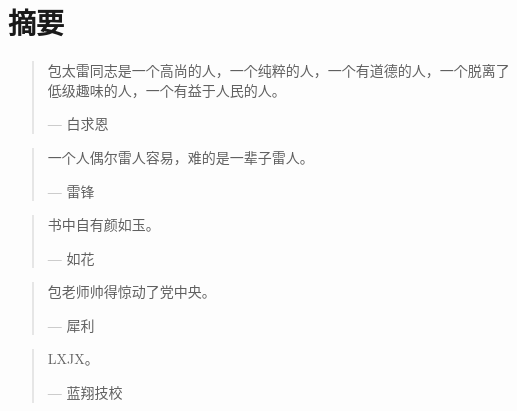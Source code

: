 \chapter{摘\hspace{2em}要}

\begin{quotation}
包太雷同志是一个高尚的人，一个纯粹的人，一个有道德的人，一个脱离了低级趣味的人，一个有益于人民的人。
\begin{flushright}
    --- 白求恩
\end{flushright}
\end{quotation}

\begin{quotation}
一个人偶尔雷人容易，难的是一辈子雷人。
\begin{flushright}
    --- 雷锋
\end{flushright}
\end{quotation}

\begin{quotation}
书中自有颜如玉。
\begin{flushright}
    --- 如花
\end{flushright}
\end{quotation}

\begin{quotation}
包老师帅得惊动了党中央。
\begin{flushright}
    --- 犀利
\end{flushright}
\end{quotation}

\begin{quotation}
LXJX。
\begin{flushright}
    --- 蓝翔技校
\end{flushright}
\end{quotation}
